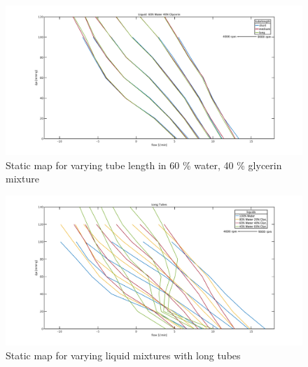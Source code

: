 \begin{figure}
  \includegraphics[width=\textwidth]{images/plots_syst_ident/60w40g_tube_length.pdf}
  \caption[Static map for different tube length in 60 \% water, 40 \% glycerin mixture]{Static map for varying tube length in 60 \% water, 40 \% glycerin mixture}
  \label{fig:60w_40g}
\end{figure}

\begin{figure}
  \includegraphics[width=\textwidth]{images/plots_syst_ident/long_liquid_change.pdf}
  \caption[Static map for varying liquid mixtures with long tubes]{Static map for varying liquid mixtures with long tubes}
  \label{fig:long_tubes}
\end{figure}
